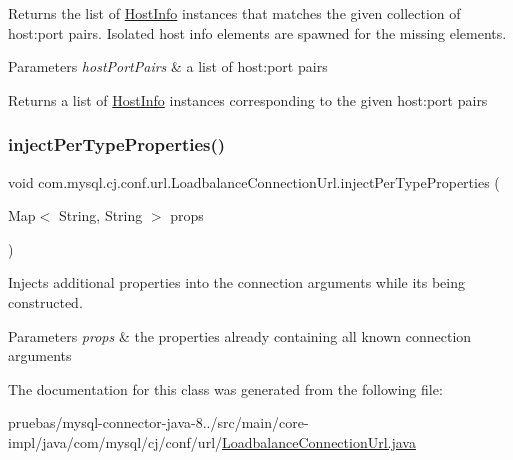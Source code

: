 Returns the list of \mbox{\hyperlink{classcom_1_1mysql_1_1cj_1_1conf_1_1_host_info}{Host\+Info}} instances that matches the given collection of host\+:port pairs. Isolated host info elements are spawned for the missing elements.


\begin{DoxyParams}{Parameters}
{\em host\+Port\+Pairs} & a list of host\+:port pairs \\
\hline
\end{DoxyParams}
\begin{DoxyReturn}{Returns}
a list of \mbox{\hyperlink{classcom_1_1mysql_1_1cj_1_1conf_1_1_host_info}{Host\+Info}} instances corresponding to the given host\+:port pairs 
\end{DoxyReturn}
\mbox{\label{classcom_1_1mysql_1_1cj_1_1conf_1_1url_1_1_loadbalance_connection_url_a01cbac35769ac60701e6ca72290025bd}} 
\subsubsection{\texorpdfstring{inject\+Per\+Type\+Properties()}{injectPerTypeProperties()}}
{\footnotesize\ttfamily void com.\+mysql.\+cj.\+conf.\+url.\+Loadbalance\+Connection\+Url.\+inject\+Per\+Type\+Properties (\begin{DoxyParamCaption}\item[{Map$<$ String, String $>$}]{props }\end{DoxyParamCaption})\hspace{0.3cm}{\ttfamily [protected]}}

Injects additional properties into the connection arguments while it\textquotesingle{}s being constructed.


\begin{DoxyParams}{Parameters}
{\em props} & the properties already containing all known connection arguments \\
\hline
\end{DoxyParams}


The documentation for this class was generated from the following file\+:\begin{DoxyCompactItemize}
\item 
pruebas/mysql-\/connector-\/java-\/8../src/main/core-\/impl/java/com/mysql/cj/conf/url/\mbox{\hyperlink{_loadbalance_connection_url_8java}{Loadbalance\+Connection\+Url.\+java}}\end{DoxyCompactItemize}
